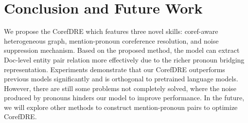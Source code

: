 \documentclass{article}
\begin{document}
\section{Conclusion and Future Work}

We propose the CorefDRE which features three novel skills: coref-aware heterogeneous graph, mention-pronoun coreference resolution, and noise suppression mechanism. Based on the proposed method, the model can extract Doc-level entity pair relation more effectively due to the richer pronoun bridging representation. Experiments demonstrate that our CorefDRE outperforms previous models significantly and is orthogonal to pretrained language models. However, there are still some problems not completely solved, where the noise produced by pronouns hinders our model to improve performance. In the future, we will explore other methods to construct mention-pronoun pairs to optimize CorefDRE.

{\small

\clearpage

}
\end{document}
